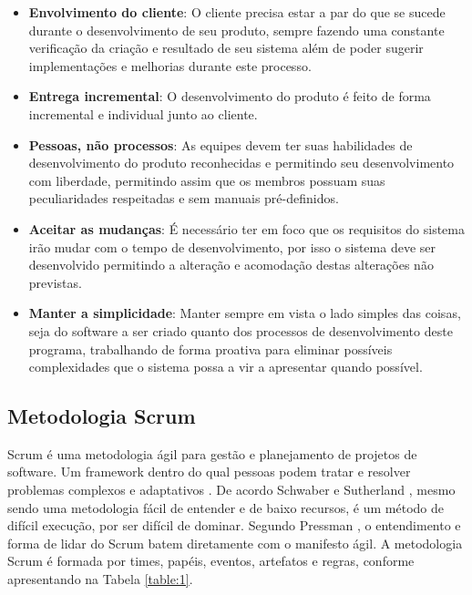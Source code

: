 \begin{itemize}
    \item \textbf{Envolvimento do cliente}: O cliente precisa estar a par do que se sucede durante o desenvolvimento de seu produto, sempre fazendo uma constante verificação da criação e resultado de seu sistema além de poder sugerir implementações e melhorias durante este processo.
    
    \item \textbf{Entrega incremental}: O desenvolvimento do produto é feito de forma incremental e individual junto ao cliente.
    
    \item \textbf{Pessoas, não processos}: As equipes devem ter suas habilidades de desenvolvimento do produto reconhecidas e permitindo seu desenvolvimento com liberdade, permitindo assim que os membros possuam suas peculiaridades respeitadas e sem manuais pré-definidos.
    
    \item \textbf{Aceitar as mudanças}: É necessário ter em foco que os requisitos do sistema irão mudar com o tempo de desenvolvimento, por isso o sistema deve ser desenvolvido permitindo a alteração e acomodação destas alterações não previstas.
    
    \item \textbf{Manter a simplicidade}: Manter sempre em vista o lado simples das coisas, seja do software a ser criado quanto dos processos de desenvolvimento deste programa, trabalhando de forma proativa para eliminar possíveis complexidades que o sistema possa a vir a apresentar quando possível.

\end{itemize}

\subsection{Metodologia Scrum}

Scrum é uma metodologia ágil para gestão e planejamento de projetos de software. Um framework dentro do qual pessoas podem tratar e resolver problemas complexos e adaptativos \cite{desenvolvimentoagil}. De acordo Schwaber e Sutherland \cite{Scrum}, mesmo sendo uma metodologia fácil de entender e de baixo recursos, é um método de difícil execução, por ser difícil de dominar. Segundo Pressman \cite{pressman}, o entendimento e forma de lidar do Scrum batem diretamente com o manifesto ágil. A metodologia Scrum é formada por times, papéis, eventos, artefatos e regras, conforme apresentando na Tabela \ref{table:1}.

